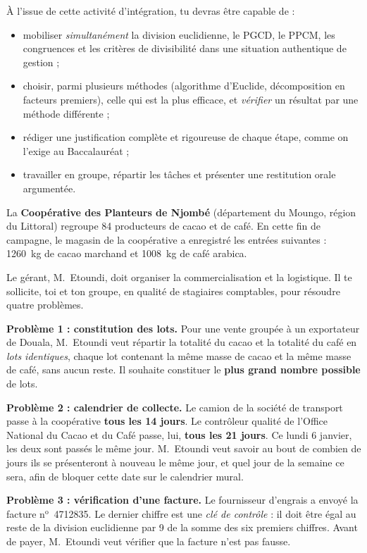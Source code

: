 \documentclass[11pt]{article}
\newcounter{popsec}
\newcounter{popsub}
\newcommand{\courssub}[1]{%
  \stepcounter{popsub}%
  \par\vspace{9pt}\noindent{\popxbold\fontsize{11.5}{13}\selectfont\color{popink}{\color{poporange}\thepopsec.\thepopsub}\hspace{6pt}#1}\par\nopagebreak\vspace{4pt}
}
\begin{document}
À l'issue de cette activité d'intégration, tu devras être capable de :
\begin{itemize}
\item mobiliser \emph{simultanément} la division euclidienne, le PGCD, le PPCM, les congruences et les critères de divisibilité dans une situation authentique de gestion ;
\item choisir, parmi plusieurs méthodes (algorithme d'Euclide, décomposition en facteurs premiers), celle qui est la plus efficace, et \emph{vérifier} un résultat par une méthode différente ;
\item rédiger une justification complète et rigoureuse de chaque étape, comme on l'exige au Baccalauréat ;
\item travailler en groupe, répartir les tâches et présenter une restitution orale argumentée.
\end{itemize}

\courssub{Situation}

La \textbf{Coopérative des Planteurs de Njombé} (département du Moungo, région du Littoral) regroupe \num{84} producteurs de cacao et de café. En cette fin de campagne, le magasin de la coopérative a enregistré les entrées suivantes : \SI{1260}{\kg} de cacao marchand et \SI{1008}{\kg} de café arabica.

Le gérant, M.~Etoundi, doit organiser la commercialisation et la logistique. Il te sollicite, toi et ton groupe, en qualité de stagiaires comptables, pour résoudre quatre problèmes.

\textbf{Problème 1 : constitution des lots.} Pour une vente groupée à un exportateur de Douala, M.~Etoundi veut répartir la totalité du cacao et la totalité du café en \emph{lots identiques}, chaque lot contenant la même masse de cacao et la même masse de café, sans aucun reste. Il souhaite constituer le \textbf{plus grand nombre possible} de lots.

\textbf{Problème 2 : calendrier de collecte.} Le camion de la société de transport passe à la coopérative \textbf{tous les 14 jours}. Le contrôleur qualité de l'Office National du Cacao et du Café passe, lui, \textbf{tous les 21 jours}. Ce lundi 6 janvier, les deux sont passés le même jour. M.~Etoundi veut savoir au bout de combien de jours ils se présenteront à nouveau le même jour, et quel jour de la semaine ce sera, afin de bloquer cette date sur le calendrier mural.

\textbf{Problème 3 : vérification d'une facture.} Le fournisseur d'engrais a envoyé la facture n$^{\text{o}}$~\num{4712835}. Le dernier chiffre est une \emph{clé de contrôle} : il doit être égal au reste de la division euclidienne par 9 de la somme des six premiers chiffres. Avant de payer, M.~Etoundi veut vérifier que la facture n'est pas fausse.
\end{document}

